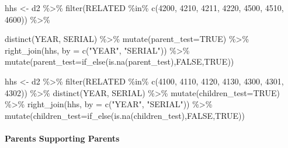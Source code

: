 \documentclass[
]{book}
\newenvironment{Shaded}{\begin{snugshade}}{\end{snugshade}}
\newcommand{\AttributeTok}[1]{\textcolor[rgb]{0.77,0.63,0.00}{#1}}
\newcommand{\ConstantTok}[1]{\textcolor[rgb]{0.00,0.00,0.00}{#1}}
\newcommand{\DecValTok}[1]{\textcolor[rgb]{0.00,0.00,0.81}{#1}}
\newcommand{\FunctionTok}[1]{\textcolor[rgb]{0.00,0.00,0.00}{#1}}
\newcommand{\NormalTok}[1]{#1}
\newcommand{\OtherTok}[1]{\textcolor[rgb]{0.56,0.35,0.01}{#1}}
\newcommand{\SpecialCharTok}[1]{\textcolor[rgb]{0.00,0.00,0.00}{#1}}
\newcommand{\StringTok}[1]{\textcolor[rgb]{0.31,0.60,0.02}{#1}}
\begin{document}
\begin{Shaded}
\begin{Highlighting}[]
\NormalTok{  hhs }\OtherTok{\textless{}{-}}\NormalTok{ d2 }\SpecialCharTok{\%\textgreater{}\%} \FunctionTok{filter}\NormalTok{(RELATED }\SpecialCharTok{\%in\%} \FunctionTok{c}\NormalTok{(}\DecValTok{4200}\NormalTok{, }\DecValTok{4210}\NormalTok{, }\DecValTok{4211}\NormalTok{, }\DecValTok{4220}\NormalTok{, }\DecValTok{4500}\NormalTok{, }\DecValTok{4510}\NormalTok{, }\DecValTok{4600}\NormalTok{)) }\SpecialCharTok{\%\textgreater{}\%} 
  
  \FunctionTok{distinct}\NormalTok{(YEAR, SERIAL) }\SpecialCharTok{\%\textgreater{}\%} \FunctionTok{mutate}\NormalTok{(}\AttributeTok{parent\_test=}\ConstantTok{TRUE}\NormalTok{) }\SpecialCharTok{\%\textgreater{}\%} \FunctionTok{right\_join}\NormalTok{(hhs, }\AttributeTok{by =} \FunctionTok{c}\NormalTok{(}\StringTok{"YEAR"}\NormalTok{, }\StringTok{"SERIAL"}\NormalTok{)) }\SpecialCharTok{\%\textgreater{}\%} \FunctionTok{mutate}\NormalTok{(}\AttributeTok{parent\_test=}\FunctionTok{if\_else}\NormalTok{(}\FunctionTok{is.na}\NormalTok{(parent\_test),}\ConstantTok{FALSE}\NormalTok{,}\ConstantTok{TRUE}\NormalTok{))}

\NormalTok{  hhs }\OtherTok{\textless{}{-}}\NormalTok{ d2 }\SpecialCharTok{\%\textgreater{}\%} \FunctionTok{filter}\NormalTok{(RELATED }\SpecialCharTok{\%in\%} \FunctionTok{c}\NormalTok{(}\DecValTok{4100}\NormalTok{, }\DecValTok{4110}\NormalTok{, }\DecValTok{4120}\NormalTok{, }\DecValTok{4130}\NormalTok{, }\DecValTok{4300}\NormalTok{, }\DecValTok{4301}\NormalTok{, }\DecValTok{4302}\NormalTok{)) }\SpecialCharTok{\%\textgreater{}\%} \FunctionTok{distinct}\NormalTok{(YEAR, SERIAL) }\SpecialCharTok{\%\textgreater{}\%} \FunctionTok{mutate}\NormalTok{(}\AttributeTok{children\_test=}\ConstantTok{TRUE}\NormalTok{) }\SpecialCharTok{\%\textgreater{}\%} \FunctionTok{right\_join}\NormalTok{(hhs, }\AttributeTok{by =} \FunctionTok{c}\NormalTok{(}\StringTok{"YEAR"}\NormalTok{, }\StringTok{"SERIAL"}\NormalTok{)) }\SpecialCharTok{\%\textgreater{}\%} \FunctionTok{mutate}\NormalTok{(}\AttributeTok{children\_test=}\FunctionTok{if\_else}\NormalTok{(}\FunctionTok{is.na}\NormalTok{(children\_test),}\ConstantTok{FALSE}\NormalTok{,}\ConstantTok{TRUE}\NormalTok{))}
\end{Highlighting}
\end{Shaded}

\hypertarget{parents-supporting-parents}{%
\paragraph{Parents Supporting Parents}\label{parents-supporting-parents}}
\end{document}
